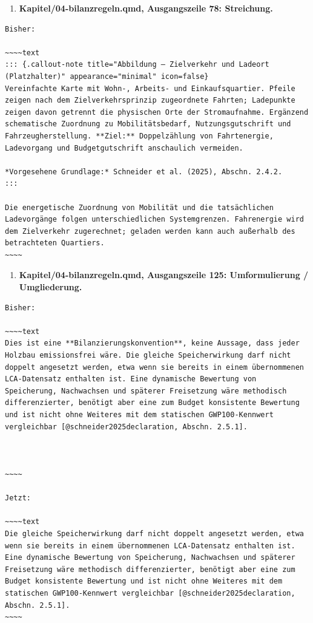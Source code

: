 \documentclass[
  ngerman,
  a4paper,
  DIV=11]{scrreprt}
\providecommand{\tightlist}{%
  \setlength{\itemsep}{0pt}\setlength{\parskip}{0pt}}
\begin{document}
\begin{enumerate}
\def\labelenumi{\arabic{enumi}.}
\setcounter{enumi}{113}
\tightlist
\item
  \textbf{Kapitel/04-bilanzregeln.qmd, Ausgangszeile 78: Streichung.}
\end{enumerate}

\begin{verbatim}
Bisher:

~~~~text
::: {.callout-note title="Abbildung – Zielverkehr und Ladeort (Platzhalter)" appearance="minimal" icon=false}
Vereinfachte Karte mit Wohn-, Arbeits- und Einkaufsquartier. Pfeile zeigen nach dem Zielverkehrsprinzip zugeordnete Fahrten; Ladepunkte zeigen davon getrennt die physischen Orte der Stromaufnahme. Ergänzend schematische Zuordnung zu Mobilitätsbedarf, Nutzungsgutschrift und Fahrzeugherstellung. **Ziel:** Doppelzählung von Fahrtenergie, Ladevorgang und Budgetgutschrift anschaulich vermeiden.

*Vorgesehene Grundlage:* Schneider et al. (2025), Abschn. 2.4.2.
:::

Die energetische Zuordnung von Mobilität und die tatsächlichen Ladevorgänge folgen unterschiedlichen Systemgrenzen. Fahrenergie wird dem Zielverkehr zugerechnet; geladen werden kann auch außerhalb des betrachteten Quartiers.
~~~~
\end{verbatim}

\begin{enumerate}
\def\labelenumi{\arabic{enumi}.}
\setcounter{enumi}{114}
\tightlist
\item
  \textbf{Kapitel/04-bilanzregeln.qmd, Ausgangszeile 125: Umformulierung
  / Umgliederung.}
\end{enumerate}

\begin{verbatim}
Bisher:

~~~~text
Dies ist eine **Bilanzierungskonvention**, keine Aussage, dass jeder Holzbau emissionsfrei wäre. Die gleiche Speicherwirkung darf nicht doppelt angesetzt werden, etwa wenn sie bereits in einem übernommenen LCA-Datensatz enthalten ist. Eine dynamische Bewertung von Speicherung, Nachwachsen und späterer Freisetzung wäre methodisch differenzierter, benötigt aber eine zum Budget konsistente Bewertung und ist nicht ohne Weiteres mit dem statischen GWP100-Kennwert vergleichbar [@schneider2025declaration, Abschn. 2.5.1].



~~~~

Jetzt:

~~~~text
Die gleiche Speicherwirkung darf nicht doppelt angesetzt werden, etwa wenn sie bereits in einem übernommenen LCA-Datensatz enthalten ist. Eine dynamische Bewertung von Speicherung, Nachwachsen und späterer Freisetzung wäre methodisch differenzierter, benötigt aber eine zum Budget konsistente Bewertung und ist nicht ohne Weiteres mit dem statischen GWP100-Kennwert vergleichbar [@schneider2025declaration, Abschn. 2.5.1].
~~~~
\end{verbatim}
\end{document}
